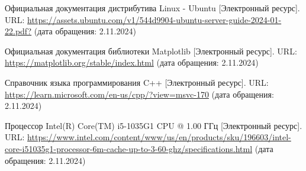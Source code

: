 \renewcommand\bibname{\hfill\parbox{\dimexpr\textwidth-2cm}{\centering\Large СПИСОК ИСПОЛЬЗОВАННЫХ ИСТОЧНИКОВ}\hfill}

\begin{thebibliography}{9}
	
	 Официальная документация дистрибутива Linux - Ubuntu [Электронный ресурс]. URL: \url{https://assets.ubuntu.com/v1/544d9904-ubuntu-server-guide-2024-01-22.pdf?} (дата обращения: 2.11.2024)
	
	 Официальная документация библиотеки Matplotlib [Электронный ресурс]. URL: \url{https://matplotlib.org/stable/index.html} (дата обращения: 2.11.2024)
	
	 Справочник языка программирования C++ [Электронный ресурс]. URL: \url{https://learn.microsoft.com/en-us/cpp/?view=msvc-170} (дата обращения: 2.11.2024)
	
	 Процессор Intel(R) Core(TM) i5-1035G1 CPU @ 1.00 ГГц [Электронный ресурс]. URL: \url{https://www.intel.com/content/www/us/en/products/sku/196603/intel-core-i51035g1-processor-6m-cache-up-to-3-60-ghz/specifications.html} (дата обращения: 2.11.2024)
	
\end{thebibliography}
